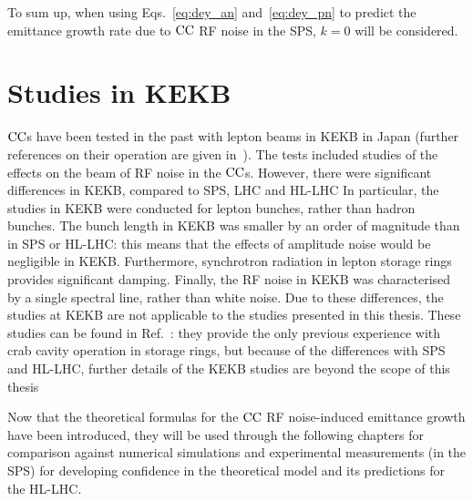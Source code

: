 To sum up, when using Eqs.~\eqref{eq:dey_an} and~\eqref{eq:dey_pn} to predict the emittance growth rate due to ${\mathrm{CC}}$ RF noise in the SPS, $k=0$ will be considered.

\section{Studies in KEKB}\label{eq:past_studies_KEKB}
${\mathrm{CC}}$s have been tested in the past with lepton beams in KEKB in Japan (further references on their operation are given in~\cite{CC_KEKB_4440798, Funakoshi:1955812, oide:pac07-mozaki01}). %
The tests included studies of the effects on the beam of RF noise in the ${\mathrm{CC}}$s. However, there were significant differences in KEKB, compared to SPS, LHC and HL-LHC In particular, the studies in KEKB were conducted for lepton bunches, rather than hadron bunches.  The bunch length in KEKB was smaller by an order of magnitude than in SPS or HL-LHC: this means that the effects of amplitude noise would be negligible in KEKB.  Furthermore, synchrotron radiation in lepton storage rings provides significant damping.  Finally, the RF noise in KEKB was characterised by a single spectral line, rather than white noise. Due to these differences, the studies at KEKB are not applicable to the studies presented in this thesis. These studies can be found in Ref.~\cite{PhysRevSTAB.14.111003}: they provide the only previous experience with crab cavity operation in storage rings, but because of the differences with SPS and HL-LHC, further details of the KEKB studies are beyond the scope of this thesis



Now that the theoretical formulas for the ${\mathrm{CC}}$ RF noise-induced emittance growth have been introduced, they will be used through the following chapters for comparison against numerical simulations and experimental measurements (in the SPS) for developing confidence in the theoretical model and its predictions for the HL-LHC.
